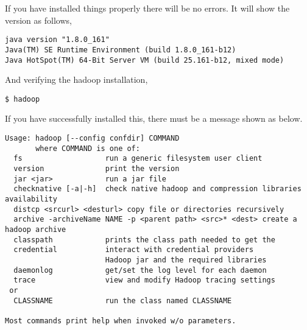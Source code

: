 If you have installed things properly there will be no errors. It will
show the version as follows,

\begin{lstlisting}
java version "1.8.0_161"
Java(TM) SE Runtime Environment (build 1.8.0_161-b12)
Java HotSpot(TM) 64-Bit Server VM (build 25.161-b12, mixed mode)
\end{lstlisting}

And verifying the hadoop installation,

\begin{lstlisting}
$ hadoop
\end{lstlisting}

If you have successfully installed this, there must be a message shown
as below.

\begin{lstlisting}
Usage: hadoop [--config confdir] COMMAND
       where COMMAND is one of:
  fs                   run a generic filesystem user client
  version              print the version
  jar <jar>            run a jar file
  checknative [-a|-h]  check native hadoop and compression libraries availability
  distcp <srcurl> <desturl> copy file or directories recursively
  archive -archiveName NAME -p <parent path> <src>* <dest> create a hadoop archive
  classpath            prints the class path needed to get the
  credential           interact with credential providers
                       Hadoop jar and the required libraries
  daemonlog            get/set the log level for each daemon
  trace                view and modify Hadoop tracing settings
 or
  CLASSNAME            run the class named CLASSNAME

Most commands print help when invoked w/o parameters.
\end{lstlisting}
